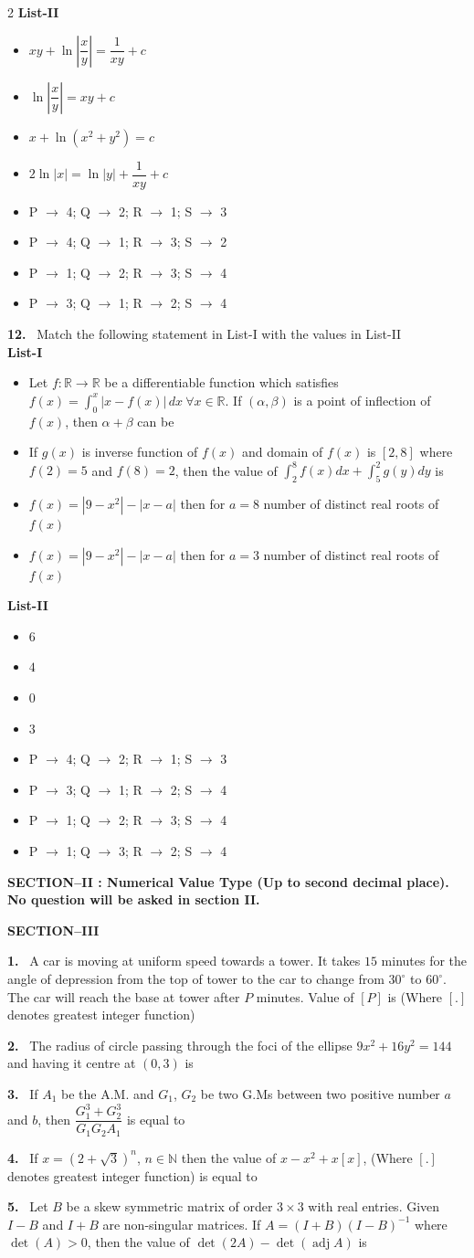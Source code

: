 \documentclass[10pt]{extarticle}
\newcommand{\sect}[1]{\par\smallskip\noindent\textbf{#1}\par}
\newcommand{\qn}[1]{\par\smallskip\noindent\textbf{#1.}~}
\newenvironment{qoptions}{\begin{itemize}[leftmargin=1.8em,itemsep=1pt,topsep=2pt,label={}]}{\end{itemize}}
\newcommand{\opt}[2]{\item[(#1)] #2}
\begin{document}
\begin{multicols}{2}
\noindent\textbf{List-II}
\begin{qoptions}
\opt{1}{$xy+\ln\left|\dfrac xy\right|=\dfrac1{xy}+c$}
\opt{2}{$\ln\left|\dfrac xy\right|=xy+c$}
\opt{3}{$x+\ln(x^2+y^2)=c$}
\opt{4}{$2\ln|x|=\ln|y|+\dfrac1{xy}+c$}
\end{qoptions}
\begin{qoptions}
\opt{A}{P $\to$ 4; Q $\to$ 2; R $\to$ 1; S $\to$ 3}
\opt{B}{P $\to$ 4; Q $\to$ 1; R $\to$ 3; S $\to$ 2}
\opt{C}{P $\to$ 1; Q $\to$ 2; R $\to$ 3; S $\to$ 4}
\opt{D}{P $\to$ 3; Q $\to$ 1; R $\to$ 2; S $\to$ 4}
\end{qoptions}
\qn{12} Match the following statement in List-I with the values in List-II\\
\textbf{List-I}
\begin{qoptions}
\opt{P}{Let $f:\mathbb R\to\mathbb R$ be a differentiable function which satisfies $f(x)=\displaystyle\int_0^x|x-f(x)|\,dx\ \forall x\in\mathbb R$. If $(\alpha,\beta)$ is a point of inflection of $f(x)$, then $\alpha+\beta$ can be}
\opt{Q}{If $g(x)$ is inverse function of $f(x)$ and domain of $f(x)$ is $[2,8]$ where $f(2)=5$ and $f(8)=2$, then the value of $\displaystyle\int_2^8 f(x)dx+\int_5^2 g(y)dy$ is}
\opt{R}{$f(x)=|9-x^2|-|x-a|$ then for $a=8$ number of distinct real roots of $f(x)$}
\opt{S}{$f(x)=|9-x^2|-|x-a|$ then for $a=3$ number of distinct real roots of $f(x)$}
\end{qoptions}
\noindent\textbf{List-II}
\begin{qoptions}
\opt{1}{$6$}
\opt{2}{$4$}
\opt{3}{$0$}
\opt{4}{$3$}
\end{qoptions}
\begin{qoptions}
\opt{A}{P $\to$ 4; Q $\to$ 2; R $\to$ 1; S $\to$ 3}
\opt{B}{P $\to$ 3; Q $\to$ 1; R $\to$ 2; S $\to$ 4}
\opt{C}{P $\to$ 1; Q $\to$ 2; R $\to$ 3; S $\to$ 4}
\opt{D}{P $\to$ 1; Q $\to$ 3; R $\to$ 2; S $\to$ 4}
\end{qoptions}
\par\smallskip\noindent\textbf{SECTION--II : Numerical Value Type (Up to second decimal place). No question will be asked in section II.}\par
\sect{SECTION--III}
\qn{1} A car is moving at uniform speed towards a tower. It takes $15$ minutes for the angle of depression from the top of tower to the car to change from $30^\circ$ to $60^\circ$. The car will reach the base at tower after $P$ minutes. Value of $[P]$ is (Where $[.]$ denotes greatest integer function)
\qn{2} The radius of circle passing through the foci of the ellipse $9x^2+16y^2=144$ and having it centre at $(0,3)$ is
\qn{3} If $A_1$ be the A.M. and $G_1$, $G_2$ be two G.Ms between two positive number $a$ and $b$, then $\dfrac{G_1^3+G_2^3}{G_1G_2A_1}$ is equal to
\qn{4} If $x=\left(2+\sqrt3\right)^n$, $n\in\mathbb N$ then the value of $x-x^2+x[x]$, (Where $[.]$ denotes greatest integer function) is equal to
\qn{5} Let $B$ be a skew symmetric matrix of order $3\times3$ with real entries. Given $I-B$ and $I+B$ are non-singular matrices. If $A=(I+B)(I-B)^{-1}$ where $\det(A)>0$, then the value of $\det(2A)-\det(\operatorname{adj}A)$ is


\end{multicols}
\end{document}
